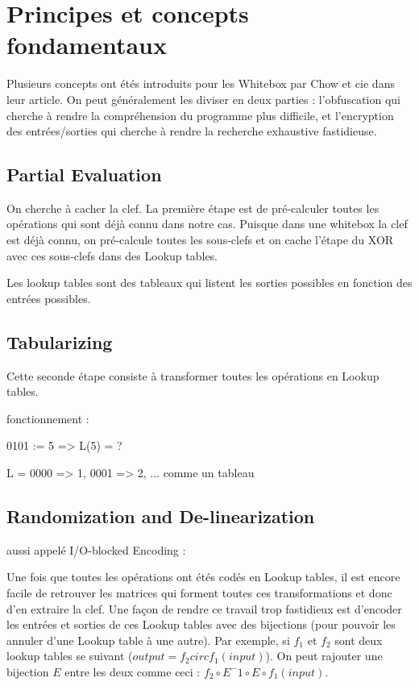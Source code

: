 \documentclass[a4paper,12pt]{article}
\begin{document}
\section{Principes et concepts fondamentaux}

Plusieurs concepts ont étés introduits pour les Whitebox par Chow et cie dans leur article. On peut généralement les diviser en deux parties : l'obfuscation qui cherche à rendre la compréhension du programme plus difficile, et
 l'encryption des entrées/sorties qui cherche à rendre la recherche exhaustive fastidieuse.

\subsection{Partial Evaluation}

On cherche à cacher la clef. La première étape est de pré-calculer toutes les opérations qui sont déjà connu dans notre cas. Puisque dans une whitebox la clef est déjà connu, on pré-calcule toutes les sous-clefs et on cache l'étape du XOR avec ces sous-clefs dans des Lookup tables.

Les lookup tables sont des tableaux qui listent les sorties possibles en fonction des entrées possibles.

\subsection{Tabularizing}

Cette seconde étape consiste à transformer toutes les opérations en Lookup tables.

fonctionnement :

0101 := 5 => L(5) = ?

L = { 0000 => 1, 0001 => 2, ... } comme un tableau

\subsection{Randomization and De-linearization}

aussi appelé I/O-blocked Encoding :

Une fois que toutes les opérations ont étés codés en Lookup tables, il est encore facile de retrouver les matrices qui forment toutes ces transformations et donc d'en extraire la clef. Une façon de rendre ce travail trop fastidieux est d'encoder les entrées et sorties de ces Lookup tables avec des bijections (pour pouvoir les annuler d'une Lookup table à une autre).
Par exemple, si $f_1$ et $f_2$ sont deux lookup tables se suivant ($output = f_2 circ f_1(input)$). On peut rajouter une bijection $E$ entre les deux comme ceci : $f_2 \circ E^-1 \circ E \circ f_1(input)$.
\end{document}
